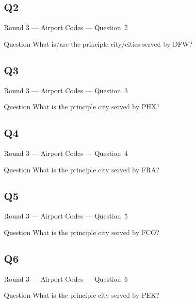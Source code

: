 \documentclass[11pt]{beamer}
\begin{document}
\subsection*{Q2}
\begin{frame}[t]{Round 3 --- Airport Codes --- \mbox{Question 2}}
\begin{block}{Question}
What is/are the principle city/cities served by DFW\@?
\end{block}
\end{frame}
\subsection*{Q3}
\begin{frame}[t]{Round 3 --- Airport Codes --- \mbox{Question 3}}
\begin{block}{Question}
What is the principle city served by PHX\@?
\end{block}
\end{frame}
\subsection*{Q4}
\begin{frame}[t]{Round 3 --- Airport Codes --- \mbox{Question 4}}
\begin{block}{Question}
What is the principle city served by FRA\@?
\end{block}
\end{frame}
\subsection*{Q5}
\begin{frame}[t]{Round 3 --- Airport Codes --- \mbox{Question 5}}
\begin{block}{Question}
What is the principle city served by FCO\@?
\end{block}
\end{frame}
\subsection*{Q6}
\begin{frame}[t]{Round 3 --- Airport Codes --- \mbox{Question 6}}
\begin{block}{Question}
What is the principle city served by PEK\@?
\end{block}
\end{frame}
\end{document}
